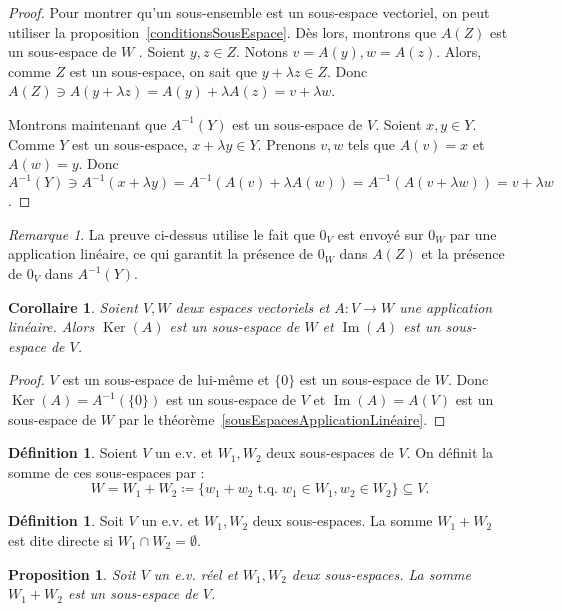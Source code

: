\documentclass{article}
\DeclareMathOperator{\tq}{\text{ t.q. }}
\DeclareMathOperator{\Ker}{Ker}
\DeclareMathOperator{\Imf}{Im}
\newtheorem{prp}[thm]{Proposition}
\newtheorem{cor}[thm]{Corollaire}
\theoremstyle{definition}
\newtheorem{déf}[thm]{Définition}
\theoremstyle{remark}
\newtheorem*{rmq}{Remarque}
\begin{document}
		\begin{proof} Pour montrer qu'un sous-ensemble est un sous-espace vectoriel, on peut utiliser la proposition~\ref{conditionsSousEspace}. Dès lors, montrons que
		$A(Z)$ est un sous-espace de $W$ . Soient $y, z \in Z$. Notons $v = A(y), w = A(z)$. Alors, comme $Z$ est un sous-espace, on sait que $y + \lambda z \in Z$. Donc
		$A(Z) \ni A(y + \lambda z) = A(y) + \lambda A(z) = v + \lambda w$.
		
		Montrons maintenant que $A^{-1}(Y)$ est un sous-espace de $V$. Soient $x, y \in Y$. Comme $Y$ est un sous-espace, $x + \lambda y \in Y$. Prenons $v, w$ tels que
		$A(v) = x$ et $A(w) = y$. Donc $A^{-1}(Y) \ni A^{-1}(x + \lambda y) = A^{-1}(A(v) + \lambda A(w)) = A^{-1}(A(v + \lambda w)) = v+\lambda w$. \end{proof}

		\begin{rmq} La preuve ci-dessus utilise le fait que $0_V$ est envoyé sur $0_W$ par une application linéaire, ce qui garantit la présence de $0_W$ dans $A(Z)$
		et la présence de $0_V$ dans $A^{-1}(Y)$. \end{rmq}

		\begin{cor} Soient $V, W$ deux espaces vectoriels et $A : V \to W$ une application linéaire. Alors $\Ker(A)$ est un sous-espace de $W$ et $\Imf(A)$ est un sous-espace
		de $V$. \end{cor}

		\begin{proof} $V$ est un sous-espace de lui-même et $\{0\}$ est un sous-espace de $W$. Donc $\Ker(A) = A^{-1}(\{0\})$ est un sous-espace de $V$ et $\Imf(A) = A(V)$
		est un sous-espace de $W$ par le théorème~\ref{sousEspacesApplicationLinéaire}.\end{proof}

		\begin{déf} Soient $V$ un e.v. et $W_1, W_2$ deux sous-espaces de $V$. On définit la somme de ces sous-espaces par :
		\[W = W_1 + W_2 \coloneqq \{w_1 + w_2 \tq w_1 \in W_1, w_2 \in W_2\} \subseteq V.\] \end{déf}

		\begin{déf} Soit $V$ un e.v. et $W_1, W_2$ deux sous-espaces. La somme $W_1 + W_2$ est dite directe si $W_1 \cap W_2 = \emptyset$. \end{déf}

		\begin{prp} Soit $V$ un e.v. réel et $W_1, W_2$ deux sous-espaces. La somme $W_1 + W_2$ est un sous-espace de $V$. \end{prp}
\end{document}
